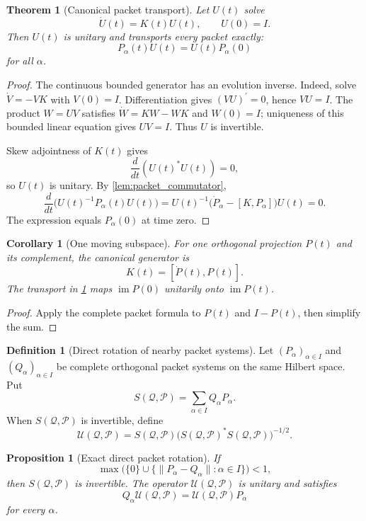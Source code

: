 \documentclass[11pt,a4paper]{article}
\newtheorem{theorem}{Theorem}[section]
\theoremstyle{plain}
\newtheorem{proposition}[proposition]{Proposition}
\newtheorem{corollary}[corollary]{Corollary}
\theoremstyle{definition}
\newtheorem{definition}[definition]{Definition}
\theoremstyle{remark}
\newcommand{\im}{\operatorname{im}}
\newcommand{\Pcal}{\mathcal P}
\newcommand{\Qcal}{\mathcal Q}
\newcommand{\Ucal}{\mathcal U}
\begin{document}
\begin{theorem}[Canonical packet transport]\label{thm:kato_transport}
Let $U(t)$ solve
\[
\dot U(t)=K(t)U(t),
\qquad
U(0)=I.
\]
Then $U(t)$ is unitary and transports every packet exactly:
\[
P_\alpha(t)U(t)=U(t)P_\alpha(0)
\]
for all $\alpha$.
\end{theorem}

\begin{proof}
The continuous bounded generator has an evolution inverse. Indeed, solve $\dot V=-VK$ with $V(0)=I$. Differentiation gives $(VU)^{\prime}=0$, hence $VU=I$. The product $W=UV$ satisfies $\dot W=KW-WK$ and $W(0)=I$; uniqueness of this bounded linear equation gives $UV=I$. Thus $U$ is invertible.

Skew adjointness of $K(t)$ gives
\[
\frac{d}{dt}(U(t)^*U(t))=0,
\]
so $U(t)$ is unitary.  By \cref{lem:packet_commutator},
\[
\frac{d}{dt}\big(U(t)^{-1}P_\alpha(t)U(t)\big)
=
U(t)^{-1}\big(\dot P_\alpha-[K,P_\alpha]\big)U(t)
=0.
\]
The expression equals $P_\alpha(0)$ at time zero.
\end{proof}

\begin{corollary}[One moving subspace]\label{cor:one_moving_subspace}
For one orthogonal projection $P(t)$ and its complement, the canonical generator is
\[
K(t)=[\dot P(t),P(t)].
\]
The transport in \cref{thm:kato_transport} maps $\im P(0)$ unitarily onto $\im P(t)$.
\end{corollary}

\begin{proof}
Apply the complete packet formula to $P(t)$ and $I-P(t)$, then simplify the sum.
\end{proof}


\begin{definition}[Direct rotation of nearby packet systems]\label{def:packet_direct_rotation}
Let $(P_\alpha)_{\alpha\in I}$ and $(Q_\alpha)_{\alpha\in I}$ be complete orthogonal packet systems on the same Hilbert space.  Put
\[
S(\Qcal,\Pcal)=\sum_{\alpha\in I}Q_\alpha P_\alpha.
\]
When $S(\Qcal,\Pcal)$ is invertible, define
\[
\Ucal(\Qcal,\Pcal)
=
S(\Qcal,\Pcal)
\big(S(\Qcal,\Pcal)^*S(\Qcal,\Pcal)\big)^{-1/2}.
\]
\end{definition}

\begin{proposition}[Exact direct packet rotation]\label{prop:packet_direct_rotation}
If
\[
\max\bigl(\{0\}\cup\{\|P_\alpha-Q_\alpha\|:\alpha\in I\}\bigr)<1,
\]
then $S(\Qcal,\Pcal)$ is invertible.  The operator $\Ucal(\Qcal,\Pcal)$ is unitary and satisfies
\[
Q_\alpha\Ucal(\Qcal,\Pcal)
=
\Ucal(\Qcal,\Pcal)P_\alpha
\]
for every $\alpha$.
\end{proposition}
\end{document}
